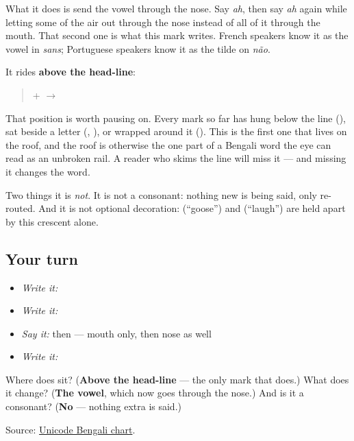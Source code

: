 What it does is send the vowel through the nose. Say \emph{ah}, then say \emph{ah} again while letting some of the air out through the nose instead of all of it through the mouth. That second one is what this mark writes. French speakers know it as the vowel in \emph{sans}; Portuguese speakers know it as the tilde on \emph{não}.

It rides \textbf{above the head-line}:

\begin{quote}
\textbf{} + \textbf{} $\to$ \textbf{}
\end{quote}

That position is worth pausing on. Every mark so far has hung below the line (\textbf{}), sat beside a letter (\textbf{}, \textbf{}), or wrapped around it (\textbf{}). This is the first one that lives on the roof, and the roof is otherwise the one part of a Bengali word the eye can read as an unbroken rail. A reader who skims the line will miss it — and missing it changes the word.

Two things it is \emph{not}. It is not a consonant: nothing new is being said, only re-routed. And it is not optional decoration: \textbf{} (\textquotedblleft{}goose\textquotedblright{}) and \textbf{} (\textquotedblleft{}laugh\textquotedblright{}) are held apart by this crescent alone.

\subsection*{Your turn}
\begin{itemize}
\raggedright
  \item \emph{Write it:} 
  \item \emph{Write it:} 
  \item \emph{Say it:} \textbf{} then \textbf{} — mouth only, then nose as well
  \item \emph{Write it:} 
\end{itemize}

\begin{tcolorbox}[breakable,colback=teal!4,colframe=teal!35!black,title={Before you move on}]
Where does \textbf{} sit? (\textbf{Above the head-line} — the only mark that does.) What does it change? (\textbf{The vowel}, which now goes through the nose.) And is it a consonant? (\textbf{No} — nothing extra is said.)

Source: \href{https://www.unicode.org/charts/PDF/U0980.pdf}{Unicode Bengali chart}.
\end{tcolorbox}
